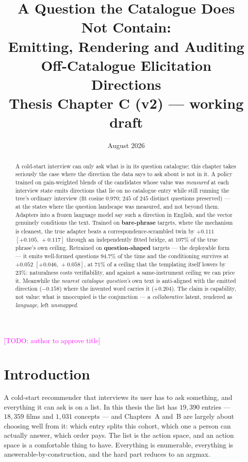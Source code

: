 \documentclass[11pt]{article}
\title{\textbf{A Question the Catalogue Does Not Contain:\\Emitting, Rendering and Auditing
Off-Catalogue Elicitation Directions}\\[4pt]\large Thesis Chapter C (v2) --- working draft}
\author{}
\date{August 2026}
\newcommand{\todo}[1]{\textcolor{magenta}{[TODO: #1]}}
\begin{document}
\maketitle

\begin{abstract}
\noindent A cold-start interview can only ask what is in its question catalogue; this chapter takes
seriously the case where the direction the data says to ask about is not in it. A policy trained on
gain-weighted blends of the candidates whose value was \emph{measured} at each interview state emits
directions that lie on no catalogue entry while still running the tree's ordinary interview (fit
cosine $0.970$; $245$ of $245$ distinct questions preserved) --- at the states where the question
landscape was measured, and not beyond them. Adapters into a frozen language model say such a
direction in English, and the vector genuinely conditions the text. Trained on \textbf{bare-phrase}
targets, where the mechanism is cleanest, the true adapter beats a correspondence-scrambled twin by
$+0.111$ $[+0.105,\,+0.117]$ through an independently fitted bridge, at $107\%$ of the true phrase's
own ceiling. Retrained on \textbf{question-shaped} targets --- the deployable form --- it emits
well-formed questions $94.7\%$ of the time and the conditioning survives at $+0.052$
$[+0.046,\,+0.058]$, at $71\%$ of a ceiling that the templating itself lowers by $23\%$: naturalness
costs verifiability, and against a same-instrument ceiling we can price it. Meanwhile the
\emph{nearest catalogue question's} own text is anti-aligned with the emitted direction ($-0.158$)
where the invented word carries it ($+0.204$). The claim is capability, not value: what is
unoccupied is the conjunction --- a \emph{collaborative} latent, rendered as \emph{language}, left
\emph{unsnapped}.
\end{abstract}

\todo{author to approve title}

\section{Introduction}
\label{sec:intro}

A cold-start recommender that interviews its user has to ask something, and everything it can ask is
on a list. In this thesis the list has $19{,}390$ entries --- $18{,}359$ films and $1{,}031$
concepts --- and Chapters~A and~B are largely about choosing well from it: which entry splits this
cohort, which one a person can actually answer, which order pays. The list is the action space, and
an action space is a comfortable thing to have. Everything is enumerable, everything is
answerable-by-construction, and the hard part reduces to an argmax.
\end{document}
